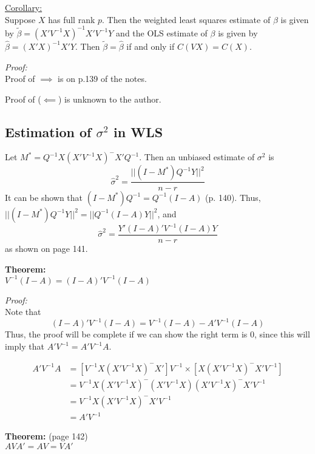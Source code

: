 \documentclass[12pt]{article}
\newcommand{\bhat}{\hat{\beta}}
\newcommand{\btilde}{\tilde{\beta}}
\numberwithin{equation}{section}
\begin{document}
\underline{Corollary:} \\
Suppose $X$ has full rank $p$. Then the weighted least squares estimate of $\beta$ is given by $\btilde = (X'V^{-1}X)^{-1} X'V^{-1}Y$ and the OLS estimate of $\beta$ is given by $\bhat = (X'X)^{-1} X'Y$. Then $\btilde = \bhat$ if and only if $C(VX) = C(X)$.

\textit{Proof:}\\
Proof of $\implies$ is on p.139 of the notes.

Proof of ($\impliedby$) is unknown to the author.

\subsection{Estimation of $\sigma^2$ in WLS}
Let $M^* = Q^{-1}X (X'V^{-1} X)^{-} X' Q^{-1}$. Then an unbiased estimate of $\sigma^2$ is 
\begin{equation*}
  \hat{\sigma}^2 = \frac{||(I - M^*)Q^{-1}Y||^2}{n - r}
\end{equation*}
It can be shown that $(I - M^*)Q^{-1} = Q^{-1}(I - A)$ (p. 140). Thus, $||(I - M^*)Q^{-1} Y||^2 = ||Q^{-1}(I - A)Y||^2$, and 
\begin{equation*}
  \hat{\sigma}^2 = \frac{Y'(I - A)' V^{-1} (I - A) Y}{n - r}
\end{equation*}
as shown on page 141.

\textbf{Theorem:} \\
$V^{-1}(I - A) = (I - A)'V^{-1}(I - A)$

\textit{Proof:}\\
Note that
\begin{equation*}
  (I - A)'V^{-1}(I - A) = V^{-1}(I - A) - A'V^{-1}(I - A)
\end{equation*}
Thus, the proof will be complete if we can show the right term is 0, since this will imply that $A'V^{-1} = A'V^{-1}A$.

\begin{align*}
  A'V^{-1}A &= [V^{-1} X (X'V^{-1} X)^{-} X']V^{-1} \times [X(X'V^{-1}X)^{-} X'V^{-1}] \\
  &= V^{-1}X(X'V^{-1} X)^{-}(X'V^{-1} X) (X'V^{-1} X)^{-} X'V^{-1} \\
  &= V^{-1} X(X'V^{-1}X)^{-} X'V^{-1} \\
  &= A'V^{-1}
\end{align*}

\textbf{Theorem:} (page 142) \\
$AVA' = AV = VA'$
\end{document}
